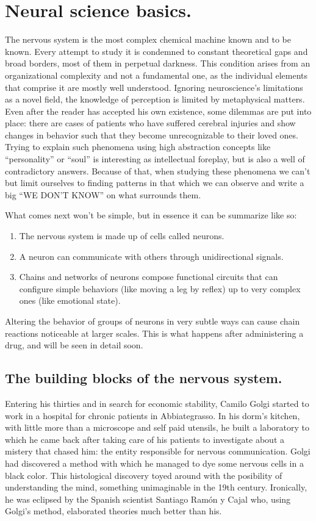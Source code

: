 \section{Neural science basics.}

The nervous system is the most complex chemical machine known and to be known. Every attempt to study it is condemned to constant theoretical gaps and broad borders, most of them in perpetual darkness. This condition arises from an organizational complexity and not a fundamental one, as the individual elements that comprise it are mostly well understood. Ignoring neuroscience's limitations as a novel field, the knowledge of perception is limited by metaphysical matters. Even after the reader has accepted his own existence, some dilemmas are put into place: there are cases of patients who have suffered cerebral injuries and show changes in behavior such that they become unrecognizable to their loved ones. Trying to explain such phenomena using high abstraction concepts like \enquote{personality} or \enquote{soul} is interesting as intellectual foreplay, but is also a well of contradictory answers. Because of that, when studying these phenomena we can't but limit ourselves to finding patterns in that which we can observe and write a big \enquote{WE DON'T KNOW} on what surrounds them.

What comes next won't be simple, but in essence it can be summarize like so:

\begin{enumerate}
	\item The nervous system is made up of cells called neurons.
	\item A neuron can communicate with others through unidirectional signals.
	\item Chains and networks of neurons compose functional circuits that can configure simple behaviors (like moving a leg by reflex) up to very complex ones (like emotional state).
\end{enumerate}

Altering the behavior of groups of neurons in very subtle ways can cause chain reactions noticeable at larger scales. This is what happens after administering a drug, and will be seen in detail soon.

\subsection{The building blocks of the nervous system.}

Entering his thirties and in search for economic stability, Camilo Golgi started to work in a hospital for chronic patients in Abbiategrasso. In his dorm's kitchen, with little more than a microscope and self paid utensils, he built a laboratory to which he came back after taking care of his patients to investigate about a mistery that chased him: the entity responsible for nervous communication. Golgi had discovered a method with which he managed to dye some nervous cells in a black color. This histological discovery toyed around with the posibility of understanding the mind, something unimaginable in the 19th century. Ironically, he was eclipsed by the Spanish scientist Santiago Ramón y Cajal who, using Golgi's method, elaborated theories much better than his.

